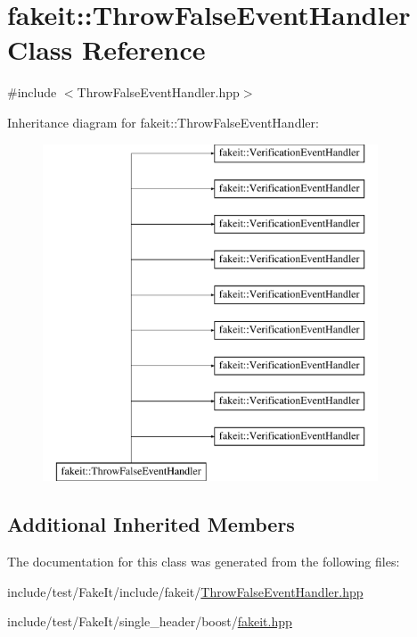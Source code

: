 \hypertarget{classfakeit_1_1ThrowFalseEventHandler}{}\section{fakeit\+::Throw\+False\+Event\+Handler Class Reference}
\label{classfakeit_1_1ThrowFalseEventHandler}


{\ttfamily \#include $<$Throw\+False\+Event\+Handler.\+hpp$>$}

Inheritance diagram for fakeit\+::Throw\+False\+Event\+Handler\+:\begin{figure}[H]
\begin{center}
\leavevmode
\includegraphics[height=10.000000cm]{classfakeit_1_1ThrowFalseEventHandler}
\end{center}
\end{figure}
\subsection*{Additional Inherited Members}


The documentation for this class was generated from the following files\+:\begin{DoxyCompactItemize}
\item 
include/test/\+Fake\+It/include/fakeit/\mbox{\hyperlink{ThrowFalseEventHandler_8hpp}{Throw\+False\+Event\+Handler.\+hpp}}\item 
include/test/\+Fake\+It/single\+\_\+header/boost/\mbox{\hyperlink{single__header_2boost_2fakeit_8hpp}{fakeit.\+hpp}}\end{DoxyCompactItemize}
